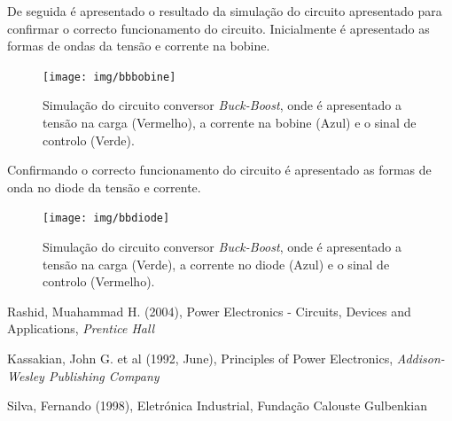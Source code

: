 \documentclass[a4paper,11pt]{article}
\numberwithin{equation}{section}
\begin{document}
De seguida é apresentado o resultado da simulação do circuito apresentado para confirmar o correcto funcionamento do circuito. Inicialmente é apresentado as formas de ondas da tensão e corrente na bobine.

\begin{figure}[h]
	\centering
	\texttt{[image: img/bbbobine]}
	\caption{Simulação do circuito conversor \textit{Buck-Boost}, onde é apresentado a tensão na carga (Vermelho), a corrente na bobine (Azul) e o sinal de controlo (Verde).}
	\label{fig:circuit_1}
	\vspace{-0.8em}
\end{figure}

Confirmando o correcto funcionamento do circuito é apresentado as formas de onda no diode da tensão e corrente.

\begin{figure}[h]
	\centering
	\texttt{[image: img/bbdiode]}
	\caption{Simulação do circuito conversor \textit{Buck-Boost}, onde é apresentado a tensão na carga (Verde), a corrente no diode (Azul) e o sinal de controlo (Vermelho).}
	\label{fig:circuit}
	\vspace{-0.8em}
\end{figure}

\pagebreak

\begin{thebibliography}{2}
	
	Rashid, Muahammad H. (2004), Power Electronics - Circuits, Devices and Applications, \textit{Prentice Hall}	
	
	Kassakian, John G. et al (1992, June), Principles of Power Electronics, \textit{Addison-Wesley Publishing Company}
	
	Silva, Fernando (1998), Eletrónica Industrial, Fundação Calouste Gulbenkian
	
\end{thebibliography}


\pagebreak
\end{document}
